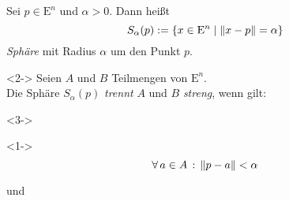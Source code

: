 \documentclass{beamer}
\newcommand{\E}{\mathrm{E}}
\newcommand{\fa}[1]{\forall \, {#1} \,:\,}
\DeclarePairedDelimiter\norm{\lVert}{\rVert}%
\begin{document}
\begin{frame}
  \begin{definition}
    Sei $p \in \E^n$ und $\alpha > 0$. Dann heißt
    \[ S_\alpha(p) := \left\{ x \in \E^n \mid \norm{x - p} = \alpha \right\} \]
    \emph{Sphäre} mit Radius $\alpha$ um den Punkt $p$.
  \end{definition}
  \begin{definition}<2->
    Seien $A$ und $B$ Teilmengen von $\E^n$.\\
    Die Sphäre $S_\alpha(p)$ \emph{trennt} $A$ und $B$ \emph{streng}, wenn gilt:
    \begin{minipage}{0.39 \linewidth}
      \begin{uncoverenv}<3->
        \vspace{10pt}
        \begin{center}
          \colorbox{white}{
          }
        \end{center}
      \end{uncoverenv}
      \begin{uncoverenv}<1->
        \[ \fa{a \in A} \norm{p - a} < \alpha \]
        \vspace{-30pt}

        \begin{center}
          und
        \end{center}
        \vspace{-34pt}


\end{uncoverenv}
\end{minipage}
\end{definition}
\end{frame}
\end{document}
